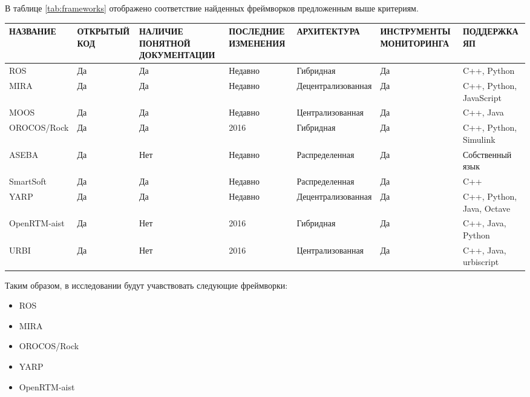 В таблице \ref{tab:frameworks} отображено соответствие найденных фреймворков предложенным выше критериям.

\begin{table*}[h!]
	\scriptsize
	\centering
	\caption{Соответствие найденных робототехнических фреймворков выделенным критериям}
	\label{tab:frameworks}
	\def\arraystretch{1.5}
	\begin{tabular}{lp{2cm}p{2cm}p{2cm}lp{2.7cm}p{2cm}}
		\toprule
		\textbf{НАЗВАНИЕ}     & \textbf{ОТКРЫТЫЙ КОД} & \textbf{НАЛИЧИЕ ПОНЯТНОЙ ДОКУМЕНТАЦИИ} & \textbf{ПОСЛЕДНИЕ ИЗМЕНЕНИЯ} & \textbf{АРХИТЕКТУРА}        & \textbf{ИНСТРУМЕНТЫ МОНИТОРИНГА} & \textbf{ПОДДЕРЖКА ЯП} \\ 
		\midrule 
		ROS          & Да           & Да                            & Недавно             & Гибридная          & Да                      & C++, Python               \\ 
		MIRA         & Да           & Да                            & Недавно             & Децентрализованная & Да                      & C++, Python, JavaScript   \\ 
		MOOS         & Да           & Да                            & Недавно             & Централизованная   & Да                      & C++, Java                 \\ 
		OROCOS/Rock  & Да           & Да                            & 2016                & Гибридная          & Да                      & C++, Python, Simulink     \\ 
		ASEBA        & Да           & Нет                           & Недавно             & Распределенная     & Да                      & Собственный язык          \\ 
		SmartSoft    & Да           & Да                            & Недавно             & Распределенная     & Да                      & C++                       \\ 
		YARP         & Да           & Да                            & Недавно             & Децентрализованная & Да                      & C++, Python, Java, Octave \\ 
		OpenRTM-aist & Да           & Нет                           & 2016                & Гибридная          & Да                      & C++, Java, Python         \\ 
		URBI         & Да           & Нет                           & 2016                & Централизованная   & Да                      & C++, Java, urbiscript     \\ 
		\bottomrule
	\end{tabular}
\end{table*}

Таким образом, в исследовании будут учавствовать следующие фреймворки:
\begin{itemize}
	\item ROS
	\item MIRA
	\item OROCOS/Rock
	\item YARP
	\item OpenRTM-aist
\end{itemize}


